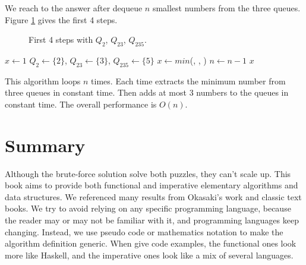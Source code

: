 \documentclass[b5paper]{article}
\begin{document}
We reach to the answer after dequeue $n$ smallest numbers from the three queues. Figure \cref{fig:q235} gives the first 4 steps.

\begin{figure}[htbp]
  \centering
  \caption{First 4 steps with $Q_2$, $Q_{23}$, $Q_{235}$.}
  \label{fig:q235}
\end{figure}

\begin{algorithmic}[1]
  \State $x \gets 1$
  \State $Q_2 \gets \{ 2 \}$, $Q_{23} \gets \{ 3 \}$, $Q_{235} \gets \{ 5 \}$
    \State $x \gets min$(, , )
      \State {}
      \State {}
      \State {}
      \State {}
      \State {}
      \State {}
      \State {}
    \Else
      \State {}
      \State {}
    \EndIf
    \State $n \gets n - 1$
  \EndWhile
  \State \Return $x$
\EndFunction
\end{algorithmic}

This algorithm loops $n$ times. Each time extracts the minimum number from three queues in constant time. Then adds at most 3 numbers to the queues in constant time. The overall performance is $O(n)$.

\section*{Summary}
Although the brute-force solution solve both puzzles, they can't scale up. This book aims to provide both functional and imperative elementary algorithms and data structures. We referenced many results from Okasaki's work\cite{okasaki-book} and classic text books\cite{CLRS}. We try to avoid relying on any specific programming language, because the reader may or may not be familiar with it, and programming languages keep changing. Instead, we use pseudo code or mathematics notation to make the algorithm definition generic. When give code examples, the functional ones look more like Haskell, and the imperative ones look like a mix of several languages.
\end{document}
